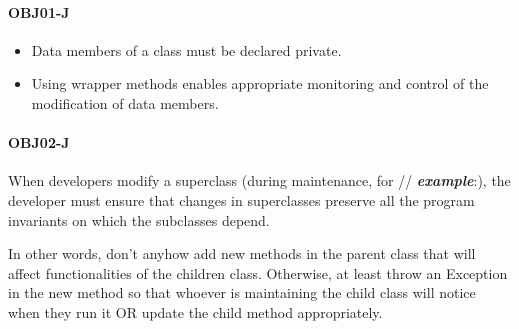 \documentclass[a4paper]{article}
\begin{document}
\paragraph{OBJ01-J}
\begin{itemize}
	\item Data members of a class must be declared private.
	\item Using wrapper methods enables appropriate monitoring and control of the modification of data members.
\end{itemize}
\paragraph{OBJ02-J}
When developers modify a superclass (during maintenance, for // \textbf{\textit{example}}:), the developer must ensure that changes in superclasses preserve all the program invariants on which the subclasses depend.
\begin{displayquote}
	In other words, don't anyhow add new methods in the parent class that will affect functionalities of the children class. Otherwise, at least throw an Exception in the new method so that whoever is maintaining the child class will notice when they run it OR update the child method appropriately.
\end{displayquote}
\end{document}
